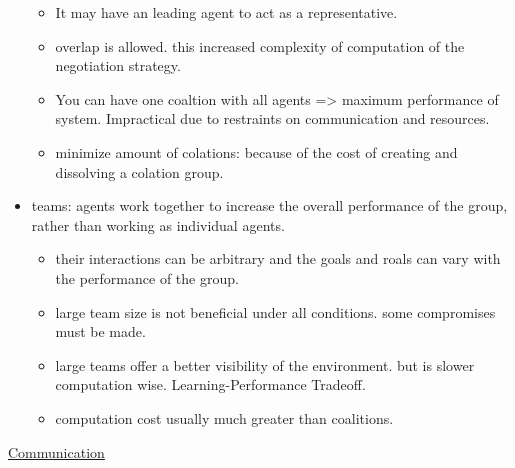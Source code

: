 \begin{itemize}[noitemsep,nolistsep]
\begin{itemize}[noitemsep,nolistsep]
		\item It may have an leading agent to act as a representative. 
		\item overlap is allowed. this increased complexity of computation of the negotiation strategy.
		\item You can have one coaltion with all agents => maximum performance of system. Impractical due to restraints on communication and resources.
		\item minimize amount of colations: because of the cost of creating and dissolving a colation group.
	\end{itemize}
	\item teams: agents work together to increase the overall performance of the group, rather than working as individual agents.
	\begin{itemize}[noitemsep,nolistsep]
		\item their interactions can be arbitrary and the goals and roals can vary with the performance of the group.
		\item large team size is not beneficial under all conditions. some compromises must be made.
		\item large teams offer a better visibility of the environment. but is slower computation wise. Learning-Performance Tradeoff.
		\item computation cost usually much greater than coalitions.
	\end{itemize}
\end{itemize}
\underline{Communication}
